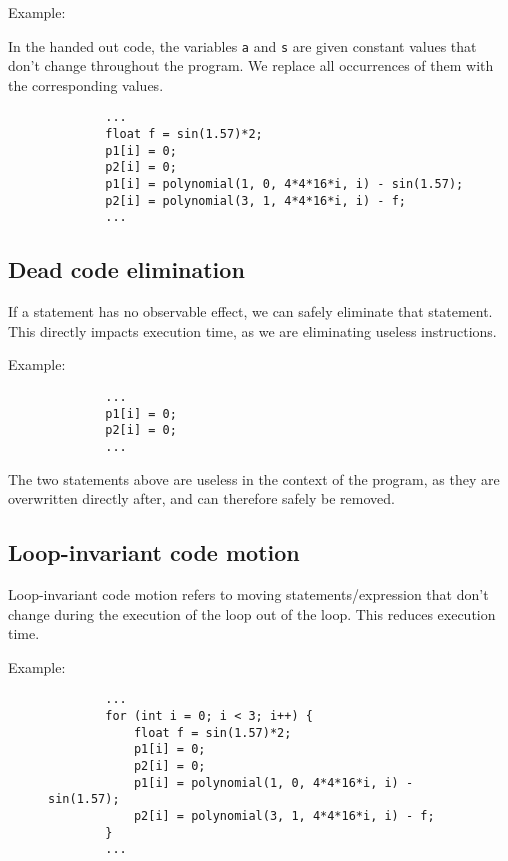 \documentclass[twoside]{article}
\begin{document}
    Example:

    In the handed out code, the variables \texttt{a} and \texttt{s} are given constant values that don't change throughout the program. 
    We replace all occurrences of them with the corresponding values.

    \newpage

    \begin{figure}[h!]
        \centering
        \begin{verbatim}
        ...
        float f = sin(1.57)*2;
        p1[i] = 0;
        p2[i] = 0;
        p1[i] = polynomial(1, 0, 4*4*16*i, i) - sin(1.57);
        p2[i] = polynomial(3, 1, 4*4*16*i, i) - f;
        ...
        \end{verbatim}
    \end{figure}


    \subsection{Dead code elimination}

    If a statement has no observable effect, we can safely eliminate that statement.
    This directly impacts execution time, as we are eliminating useless instructions.

    Example:

    \begin{figure}[h!]
        \centering
        \begin{verbatim}
        ...
        p1[i] = 0;
        p2[i] = 0;
        ...
        \end{verbatim}
    \end{figure}

    The two statements above are useless in the context of the program, as they are overwritten directly after, and can therefore safely be removed.
    
    \subsection{Loop-invariant code motion}

    Loop-invariant code motion refers to moving statements/expression that don't change during the execution of the loop out of the loop.
    This reduces execution time.

    Example:

    \begin{figure}[h!]
        \centering
        \begin{verbatim}
        ...
        for (int i = 0; i < 3; i++) {
            float f = sin(1.57)*2;
            p1[i] = 0;
            p2[i] = 0;
            p1[i] = polynomial(1, 0, 4*4*16*i, i) - sin(1.57);
            p2[i] = polynomial(3, 1, 4*4*16*i, i) - f;
        }
        ...
        \end{verbatim}
    \end{figure}
\end{document}
